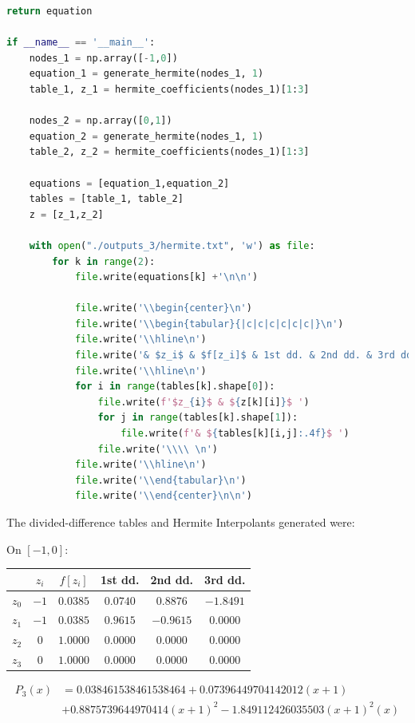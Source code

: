 \documentclass[12pt]{article}
\begin{document}
\begin{lstlisting}[language=Python, caption=1.3 Python]
    return equation

if __name__ == '__main__':
    nodes_1 = np.array([-1,0])
    equation_1 = generate_hermite(nodes_1, 1)
    table_1, z_1 = hermite_coefficients(nodes_1)[1:3]
    
    nodes_2 = np.array([0,1])
    equation_2 = generate_hermite(nodes_1, 1)
    table_2, z_2 = hermite_coefficients(nodes_1)[1:3]
    
    equations = [equation_1,equation_2]
    tables = [table_1, table_2]
    z = [z_1,z_2]
    
    with open("./outputs_3/hermite.txt", 'w') as file:        
        for k in range(2):
            file.write(equations[k] +'\n\n')

            file.write('\\begin{center}\n')
            file.write('\\begin{tabular}{|c|c|c|c|c|c|}\n')
            file.write('\\hline\n')
            file.write('& $z_i$ & $f[z_i]$ & 1st dd. & 2nd dd. & 3rd dd. \\\\\n')
            file.write('\\hline\n')
            for i in range(tables[k].shape[0]):
                file.write(f'$z_{i}$ & ${z[k][i]}$ ')
                for j in range(tables[k].shape[1]):
                    file.write(f'& ${tables[k][i,j]:.4f}$ ')
                file.write('\\\\ \n')
            file.write('\\hline\n')
            file.write('\\end{tabular}\n')
            file.write('\\end{center}\n\n')
\end{lstlisting}

The divided-difference tables and Hermite Interpolants generated were:

On $[-1,0]$:
\begin{center}
\begin{tabular}{|c|c|c|c|c|c|}
\hline
& $z_i$ & $f[z_i]$ & 1st dd. & 2nd dd. & 3rd dd. \\
\hline
$z_0$ & $-1$ & $0.0385$ & $0.0740$ & $0.8876$ & $-1.8491$ \\ 
$z_1$ & $-1$ & $0.0385$ & $0.9615$ & $-0.9615$ & $0.0000$ \\ 
$z_2$ & $0$ & $1.0000$ & $0.0000$ & $0.0000$ & $0.0000$ \\ 
$z_3$ & $0$ & $1.0000$ & $0.0000$ & $0.0000$ & $0.0000$ \\ 
\hline
\end{tabular}
\end{center}
\begin{align*}
    P_{3}(x) &= 0.038461538461538464 + 0.07396449704142012(x + 1) \\
    &+ 0.8875739644970414(x + 1)^2 - 1.849112426035503(x + 1)^2(x)
\end{align*}
\end{document}
